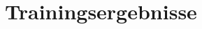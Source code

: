 \documentclass[t]{beamer}
\newcommand\pycode[1]{\inputminted[frame=lines, framesep=2mm, fontsize=\normalsize]{python}{#1}}
\begin{document}

\section{Trainingsergebnisse}
\end{document}
